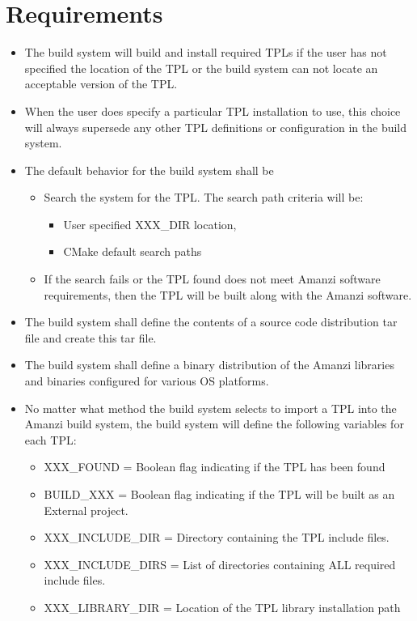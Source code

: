 \documentclass[12pt]{article}
\begin{document}
\section{Requirements}
\begin{itemize}
\item The build system will build and install required TPLs if the user has not specified the location of the TPL or
          the build system can not locate an acceptable version of the TPL.
\item When the user does specify a particular TPL installation to use, this choice will always supersede any other
          TPL definitions or configuration in the build system.
\item The default behavior for the build system shall be
\begin{itemize}
\item Search the system for the TPL. The search path criteria will be:
\begin{itemize}
\item User specified XXX\_DIR location,
\item CMake default search paths
\end{itemize}
\item If the search fails or the TPL found does not meet Amanzi software requirements, then the TPL will be built
          along with the Amanzi software.          
\end{itemize}
\item The build system shall define the contents of a source code distribution tar file and create this tar file.
\item The build system shall define a binary distribution of the Amanzi libraries and binaries configured for various
          OS platforms.
\item No matter what method the build system selects to import a TPL into the Amanzi build system, the build system 
          will define the following variables for each TPL:
\begin{itemize}
\item XXX\_FOUND = Boolean flag indicating if the TPL has been found
\item BUILD\_XXX = Boolean flag indicating if the TPL will be built as an External project.
\item XXX\_INCLUDE\_DIR = Directory containing the TPL include files.
\item XXX\_INCLUDE\_DIRS = List of directories containing ALL required include files.
\item XXX\_LIBRARY\_DIR = Location of the TPL library installation path

\end{itemize}
\end{itemize}
\end{document}
